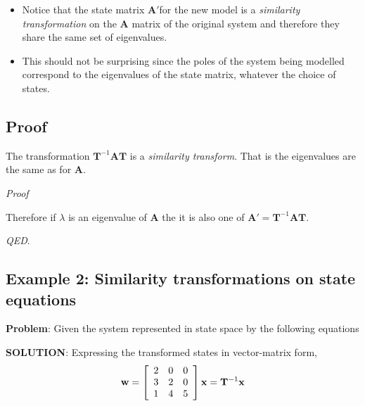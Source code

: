 \begin{itemize}
	\item Notice that the state matrix $\mathbf{A}'$for the new model is a \emph{similarity transformation} on the $\mathbf{A}$ matrix of the original system and therefore they share the same set of eigenvalues.
	\item This should not be surprising since the poles of the system being modelled correspond to the eigenvalues of the state matrix, whatever the choice of states.
\end{itemize}



\subsection*{Proof} %
\label{sub:invariance_of_system_transformation}


\ifslidesonly
\begin{slide}
	The transformation $\mathbf{T}^{-1}\mathbf{AT}$ is a \emph{similarity transform}. That is the eigenvalues are the same as for $\mathbf{A}$.

\emph{Proof}
   
\end{slide}
\fi

Therefore if $\lambda$ is an eigenvalue of $\mathbf{A}$ the it is also one of $\mathbf{A}'=\mathbf{T}^{-1}\mathbf{AT}$.

\emph{QED}.


\subsection*{Example 2: Similarity transformations on state equations}
\label{sub:similarity_transforms_on_state_equations}

\textbf{Problem}: Given the system represented in state space by the following equations



\textbf{SOLUTION}: Expressing the transformed states in vector-matrix form,
\[
{\bf{w}} = \left[ {\begin{array}{*{20}c}
   2 & 0 & 0  \\
   3 & 2 & 0  \\
   1 & 4 & 5  \\
\end{array}} \right]{\bf{x}} = {\bf{T}}^{ - 1} {\bf{x}}
\]

